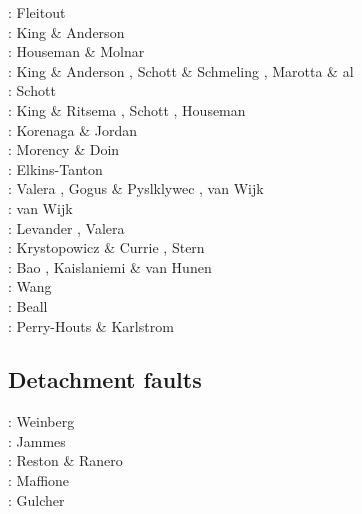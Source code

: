 \begin{scriptsize}
\nineteeneightysix: Fleitout \etal \cite{flfy86}\\
\nineteenninetyfive: King \& Anderson \cite{kian95}\\
\nineteenninetyseven: Houseman \& Molnar \cite{homo97}\\
\nineteenninetyeight: King \& Anderson \cite{kian98}, Schott \& Schmeling \cite{scsc98}, 
                      Marotta \& al \cite{mafs98}\\
\nineteenninetynine: Schott \etal \cite{scys99} \\
\twothousand: King \& Ritsema \cite{kiri00}, Schott \etal \cite{scys00}, Houseman \etal \cite{honk00}\\
\twothousandthree: Korenaga \& Jordan \cite{kojo03} \\
\twothousandfour: Morency \& Doin \cite{modo04}\\
\twothousandseven: Elkins-Tanton \cite{elki07}\\
\twothousandeight: Valera \etal \cite{vanv08}, Gogus \& Pyslklywec \cite{gopy08}, 
                   van Wijk \etal \cite{vavg08}\\
\twothousandten: van Wijk \etal \cite{vabv10}\\
\twothousandeleven: Levander \etal \cite{lesm11}, Valera \etal \cite{vanj11}\\
\twothousandthirteen: Krystopowicz \& Currie \cite{krcu13}, Stern \etal \cite{sths13}\\
\twothousandfourteen: Bao \etal \cite{baeg14}, Kaislaniemi \& van Hunen \cite{kava14}\\
\twothousandfifteen: Wang \etal \cite{wahz15}\\
\twothousandseventeen: Beall \etal \cite{bems17}\\
\twothousandeighteen: Perry-Houts \& Karlstrom \cite{peka18}
\end{scriptsize}


\subsection{Detachment faults} 

\begin{scriptsize}
\twothousandseven: Weinberg \etal \cite{werr07}\\
\twothousandten: Jammes \etal \cite{jaml10}\\
\twothousandeleven: Reston \& Ranero \cite{rera11}\\
\twothousandfifteen: Maffione \etal \cite{matv15}\\
\twothousandnineteen: Gulcher \etal \cite{gubg19}
\end{scriptsize}

